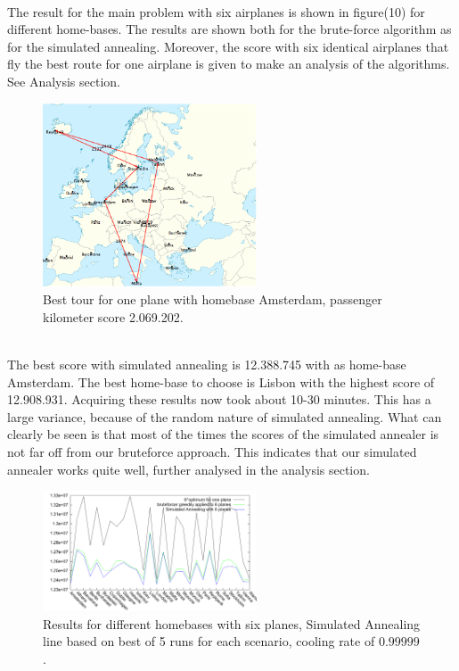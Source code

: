 \documentclass[journal]{IEEEtran}
\begin{document}
\\
The result for the main problem with six airplanes is shown in figure(10) for different home-bases. The results are shown both for the brute-force algorithm as for the simulated annealing. Moreover, the score with six identical airplanes that fly the best route for one airplane is given to make an analysis of the algorithms. See Analysis section. 
\\
\begin{figure}[!h]
\centering
\includegraphics[width=2.5in]{best_tour_one_plane_amsterdam}
\caption{Best tour for one plane with homebase Amsterdam, passenger kilometer score 2.069.202.}
\label{fig:one_plane_amsterdam}
\end{figure}
\\
The best score with simulated annealing is 12.388.745 with as home-base Amsterdam. The best home-base to choose is Lisbon with the highest score of 12.908.931.  Acquiring these results now took about 10-30 minutes. This has a large variance, because of the random nature of simulated annealing.  What can clearly be seen is that most of the times the scores of the simulated annealer is not far off from our bruteforce approach. This indicates that our simulated annealer works quite well, further analysed in the analysis section.
\\
\begin{figure}[!h]
\centering
\includegraphics[width=2.5in]{different_homebases}
\caption{Results for different homebases with six planes, Simulated Annealing line based on best of 5 runs for each scenario, cooling rate of $0.99999$.}
\label{fig:different_homebase_six_planes}
\end{figure}
\end{document}
